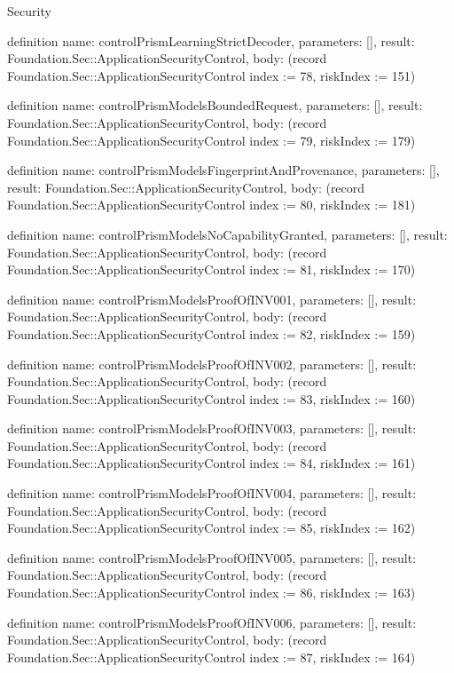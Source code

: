 \begin{lexlean}{Security}
\begin{semanticmodule}
definition{
  name: controlPrismLearningStrictDecoder,
  parameters: [],
  result: Foundation.Sec::ApplicationSecurityControl,
  body: (record Foundation.Sec::ApplicationSecurityControl {index := 78, riskIndex := 151})
}

definition{
  name: controlPrismModelsBoundedRequest,
  parameters: [],
  result: Foundation.Sec::ApplicationSecurityControl,
  body: (record Foundation.Sec::ApplicationSecurityControl {index := 79, riskIndex := 179})
}

definition{
  name: controlPrismModelsFingerprintAndProvenance,
  parameters: [],
  result: Foundation.Sec::ApplicationSecurityControl,
  body: (record Foundation.Sec::ApplicationSecurityControl {index := 80, riskIndex := 181})
}

definition{
  name: controlPrismModelsNoCapabilityGranted,
  parameters: [],
  result: Foundation.Sec::ApplicationSecurityControl,
  body: (record Foundation.Sec::ApplicationSecurityControl {index := 81, riskIndex := 170})
}

definition{
  name: controlPrismModelsProofOfINV001,
  parameters: [],
  result: Foundation.Sec::ApplicationSecurityControl,
  body: (record Foundation.Sec::ApplicationSecurityControl {index := 82, riskIndex := 159})
}

definition{
  name: controlPrismModelsProofOfINV002,
  parameters: [],
  result: Foundation.Sec::ApplicationSecurityControl,
  body: (record Foundation.Sec::ApplicationSecurityControl {index := 83, riskIndex := 160})
}

definition{
  name: controlPrismModelsProofOfINV003,
  parameters: [],
  result: Foundation.Sec::ApplicationSecurityControl,
  body: (record Foundation.Sec::ApplicationSecurityControl {index := 84, riskIndex := 161})
}

definition{
  name: controlPrismModelsProofOfINV004,
  parameters: [],
  result: Foundation.Sec::ApplicationSecurityControl,
  body: (record Foundation.Sec::ApplicationSecurityControl {index := 85, riskIndex := 162})
}

definition{
  name: controlPrismModelsProofOfINV005,
  parameters: [],
  result: Foundation.Sec::ApplicationSecurityControl,
  body: (record Foundation.Sec::ApplicationSecurityControl {index := 86, riskIndex := 163})
}

definition{
  name: controlPrismModelsProofOfINV006,
  parameters: [],
  result: Foundation.Sec::ApplicationSecurityControl,
  body: (record Foundation.Sec::ApplicationSecurityControl {index := 87, riskIndex := 164})
}


\end{semanticmodule}
\end{lexlean}
